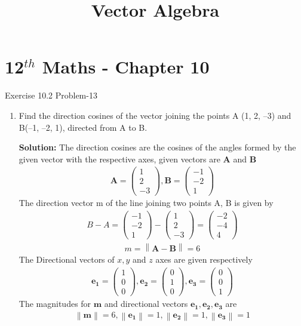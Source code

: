 \documentclass[12pt]{article}
\providecommand{\norm}[1]{\left\lVert#1\right\rVert}
\newcommand{\solution}{\noindent \textbf{Solution: }}
\newcommand{\myvec}[1]{\ensuremath{\begin{pmatrix}#1\end{pmatrix}}}
\let\vec\mathbf
\begin{document}
\begin{center}
\enlargethispage{-4cm}
\title{\textbf{Vector Algebra}}
\date{\vspace{-5ex}} %
\maketitle
\end{center}
\setcounter{page}{1}
\section*{12$^{th}$ Maths - Chapter 10}
 Exercise 10.2 Problem-13
\begin{enumerate}
\item Find the direction cosines of the vector joining the points A (1, 2, –3) and
B(–1, –2, 1), directed from A to B.

\solution The direction cosines are the cosines of the angles formed by the given vector with the respective axes, given vectors are $\vec{A}$ and $\vec{B}$
\begin{align}
	\vec{A} =\myvec{1\\2\\-3} , \vec{B}=\myvec{-1\\-2\\1}
\end{align}
The direction vector m of the line joining two points A, B is given by
\begin{align}
	B-A = \myvec{-1\\-2\\1}-\myvec{1\\2\\-3}=\myvec{-2\\-4\\4}
\end{align}
\begin{align}
	m=\norm{\vec{A-B}}=6
\end{align}
The Directional vectors of $x,y$ and $z$ axes are given respectively 
\begin{align}
   \vec{e_1} =\myvec{1\\0\\0},\vec{e_2}=\myvec{0\\1\\0},\vec{e_3} =\myvec{0\\0\\1}
\end{align}
The magnitudes for $\vec{m}$ and directional vectors $\vec{e_1},\vec{e_2},\vec{e_3}$ are
	\begin{align}
\norm{\vec{m}} =6,\norm{\vec{e_1}}={1},\norm{\vec{e_2}}={1},\norm{\vec{e_3}}={1}
	\end{align}


\end{enumerate}
\end{document}

